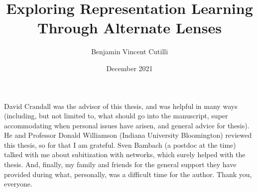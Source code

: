 \documentclass[showabstract,showacknowledgments,showpreface,showdedication]{iuphd}
\title{Exploring Representation Learning Through Alternate Lenses}
\author{Benjamin Vincent Cutilli}
\date{December 2021} %
\begin{document}
\maketitle
\acceptancepage





\begin{acknowledgments}
David Crandall was the advisor of this thesis, and was helpful in many ways (including, but not
limited to, what should go into the manuscript, super accommodating when personal issues have
arisen, and general advice for thesis). He and Professor Donald Williamson (Indiana University
Bloomington) reviewed this thesis, so for that I am grateful. Sven Bambach (a postdoc at the time)
talked with me about subitization with networks, which surely helped with the thesis. And, finally,
my family and friends for the general support they have provided during what, personally, was a
difficult time for the author. Thank you, everyone.
\end{acknowledgments}





\end{document}

